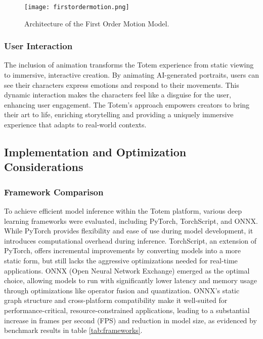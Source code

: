 \begin{figure}[!h]
    \centering
    \texttt{[image: firstordermotion.png]}
    \caption{Architecture of the First Order Motion Model.}
    \vspace{0.1cm}
    \label{fig:firstorderarchitecture}
\end{figure}

\subsubsection{User Interaction}
The inclusion of animation transforms the Totem experience from static viewing to immersive, interactive creation.
By animating AI-generated portraits, users can see their characters express emotions and respond to their movements.
This dynamic interaction makes the characters feel like a disguise for the user, enhancing user engagement.
The Totem’s approach empowers creators to bring their art to life, enriching storytelling and providing a uniquely immersive experience that adapts to real-world contexts.

\subsection{Implementation and Optimization Considerations}

\subsubsection{Framework Comparison}
To achieve efficient model inference within the Totem platform, various deep learning frameworks were evaluated, including PyTorch, TorchScript, and ONNX.
While PyTorch provides flexibility and ease of use during model development, it introduces computational overhead during inference.
TorchScript, an extension of PyTorch, offers incremental improvements by converting models into a more static form, but still lacks the aggressive optimizations needed for real-time applications.
ONNX (Open Neural Network Exchange) emerged as the optimal choice, allowing models to run with significantly lower latency and memory usage through optimizations like operator fusion and quantization.
ONNX’s static graph structure and cross-platform compatibility make it well-suited for performance-critical, resource-constrained applications, leading to a substantial increase in frames per second (FPS) and reduction in model size, as evidenced by benchmark results in table \ref{tab:frameworks}.

